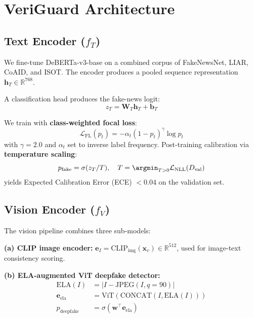 \documentclass[11pt,a4paper]{article}
\begin{document}
\section{VeriGuard Architecture}
\label{sec:arch}

\subsection{Text Encoder ($f_T$)}

We fine-tune DeBERTa-v3-base \cite{he2021deberta} on a combined corpus
of FakeNewsNet, LIAR, CoAID, and ISOT. The encoder produces a pooled
sequence representation $\mathbf{h}_T \in \mathbb{R}^{768}$.

A classification head produces the fake-news logit:
\begin{equation}
  z_T = \mathbf{W}_T \mathbf{h}_T + \mathbf{b}_T
\end{equation}

We train with \textbf{class-weighted focal loss}:
\begin{equation}
  \mathcal{L}_\text{FL}(p_t) = -\alpha_t (1 - p_t)^\gamma \log p_t
  \label{eq:focal}
\end{equation}
with $\gamma = 2.0$ and $\alpha_t$ set to inverse label frequency.
Post-training calibration via \textbf{temperature scaling}:
\begin{equation}
  p_\text{fake} = \sigma(z_T / T), \quad T = \argmin_{T>0} \mathcal{L}_\text{NLL}(D_\text{val})
\end{equation}
yields Expected Calibration Error (ECE) $< 0.04$ on the validation set.

\subsection{Vision Encoder ($f_V$)}

The vision pipeline combines three sub-models:

\textbf{(a) CLIP image encoder:} $\mathbf{e}_I = \text{CLIP}_\text{img}(\mathbf{x}_v) \in \mathbb{R}^{512}$, used for image-text consistency scoring.

\textbf{(b) ELA-augmented ViT deepfake detector:}
\begin{align}
  \text{ELA}(I) &= |I - \text{JPEG}(I, q=90)| \\
  \mathbf{e}_\text{ela} &= \text{ViT}(\text{CONCAT}(I, \text{ELA}(I))) \\
  p_\text{deepfake} &= \sigma(\mathbf{w}^\top \mathbf{e}_\text{ela})
\end{align}
\end{document}
